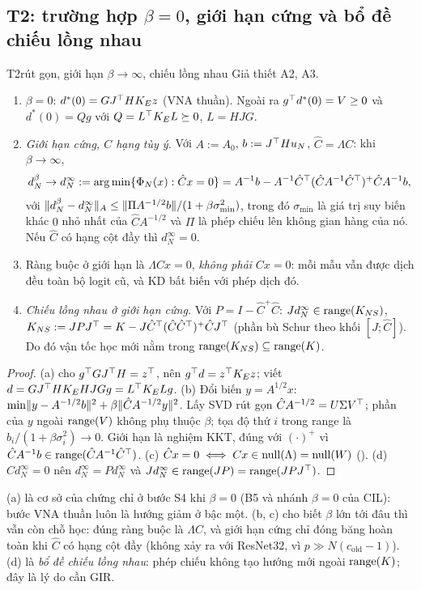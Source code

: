 \subsection{T2: trường hợp $\beta=0$, giới hạn cứng và bổ đề chiếu lồng nhau}

\begin{namedthm}{T2}{rút gọn, giới hạn $\beta\to\infty$, chiếu lồng nhau}
Giả thiết A2, A3.
\begin{enumerate}[label=(\alph*)]
\item $\beta=0$: $d^*(0)=GJ^{\top} HK_Ez$ (VNA thuần). Ngoài ra $g^{\top} d^*(0)=V\ge0$ và $d^*(0)=Qg$ với $Q=L^{\top} K_EL\succeq0$, $L=HJG$.
\item \emph{Giới hạn cứng, $C$ hạng tùy ý.} Với $A:=A_0$, $b:=J^{\top} Hu_N$, $\hat C=\Lambda C$: khi $\beta\to\infty$,
\[
d_N^{\beta}\to d_N^\infty:=\operatorname*{arg\,min}\{\Phi_N(x):\hat Cx=0\}=A^{-1}b-A^{-1}\hat C^{\top}(\hat CA^{-1}\hat C^{\top})^+\hat CA^{-1}b,
\]
với $\lVert d_N^{\beta}-d_N^\infty\rVert_A\le\lVert \Pi A^{-1/2}b\rVert/(1+\beta\sigma_{\min}^2)$, trong đó $\sigma_{\min}$ là giá trị suy biến khác $0$ nhỏ nhất của $\hat CA^{-1/2}$ và $\Pi$ là phép chiếu lên không gian hàng của nó. Nếu $\hat C$ có hạng cột đầy thì $d_N^\infty=0$.
\item Ràng buộc ở giới hạn là $\Lambda Cx=0$, \emph{không phải} $Cx=0$: mỗi mẫu vẫn được dịch đều toàn bộ logit cũ, và KD bất biến với phép dịch đó.
\item \emph{Chiếu lồng nhau ở giới hạn cứng.} Với $P=I-\hat C^+\hat C$: $Jd_N^\infty\in\operatorname{range}(K_{NS})$, $K_{NS}:=JPJ^{\top}=K-J\hat C^{\top}(\hat C\hat C^{\top})^+\hat CJ^{\top}$ (phần bù Schur theo khối $[J;\hat C]$). Do đó vận tốc học mới nằm trong $\operatorname{range}(K_{NS})\subseteq\operatorname{range}(K)$.
\end{enumerate}
\end{namedthm}
\begin{proof}
(a)  cho $g^{\top} GJ^{\top} H=z^{\top}$, nên $g^{\top} d=z^{\top} K_Ez$; viết $d=GJ^{\top} HK_EHJGg=L^{\top} K_ELg$.
(b) Đổi biến $y=A^{1/2}x$: $\min\lVert y-A^{-1/2}b\rVert^2+\beta\lVert \hat CA^{-1/2}y\rVert^2$. Lấy SVD rút gọn $\hat CA^{-1/2}=U\Sigma V^{\top}$; phần của $y$ ngoài $\operatorname{range}(V)$ không phụ thuộc $\beta$; tọa độ thứ $i$ trong range là $b_i/(1+\beta\sigma_i^2)\to0$. Giới hạn là nghiệm KKT, đúng với $(\cdot)^+$ vì $\hat CA^{-1}b\in\operatorname{range}(\hat CA^{-1}\hat C^{\top})$.
(c) $\hat Cx=0\iff Cx\in\operatorname{null}(\Lambda)=\operatorname{null}(W)$ ().
(d) $\hat Cd_N^\infty=0$ nên $d_N^\infty=Pd_N^\infty$ và $Jd_N^\infty\in\operatorname{range}(JP)=\operatorname{range}(JPJ^{\top})$.
\end{proof}
\begin{hequa}
(a) là cơ sở của chứng chỉ ở bước S4 khi $\beta=0$ (B5 và nhánh $\beta=0$ của CIL): bước VNA thuần luôn là hướng giảm ở bậc một. (b, c) cho biết $\beta$ lớn tới đâu thì vẫn còn chỗ học: đúng ràng buộc là $\Lambda C$, và giới hạn cứng chỉ đóng băng hoàn toàn khi $\hat C$ có hạng cột đầy (không xảy ra với ResNet32, vì $p\gg N(c_{\mathrm{old}}-1)$). (d) là \emph{bổ đề chiếu lồng nhau}: phép chiếu không tạo hướng mới ngoài $\operatorname{range}(K)$; đây là lý do cần GIR.
\end{hequa}
